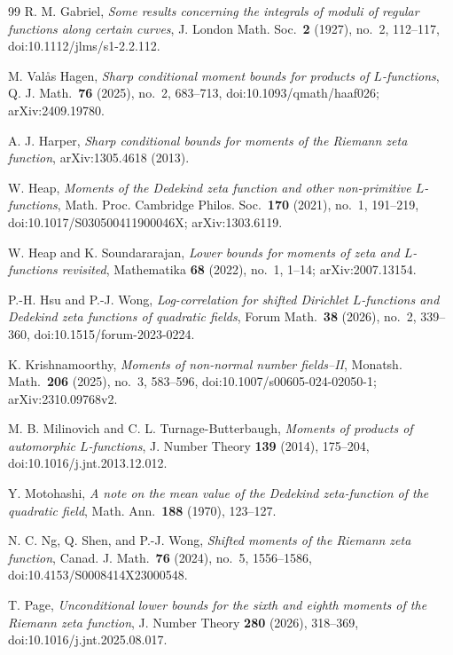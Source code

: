 \documentclass[11pt]{amsart}
\numberwithin{equation}{section}
\theoremstyle{plain}
\begin{document}
\begin{thebibliography}{99}
R. M. Gabriel,
\emph{Some results concerning the integrals of moduli of regular functions
along certain curves},
J. London Math. Soc.\ \textbf{2} (1927), no.~2, 112--117,
doi:10.1112/jlms/s1-2.2.112.

M. Val{\aa}s Hagen,
\emph{Sharp conditional moment bounds for products of $L$-functions},
Q. J. Math.\ \textbf{76} (2025), no.~2, 683--713,
doi:10.1093/qmath/haaf026; arXiv:2409.19780.

A. J. Harper,
\emph{Sharp conditional bounds for moments of the Riemann zeta function},
arXiv:1305.4618 (2013).

W. Heap,
\emph{Moments of the Dedekind zeta function and other non-primitive
$L$-functions},
Math. Proc. Cambridge Philos. Soc.\ \textbf{170} (2021), no.~1, 191--219,
doi:10.1017/S030500411900046X; arXiv:1303.6119.

W. Heap and K. Soundararajan,
\emph{Lower bounds for moments of zeta and $L$-functions revisited},
Mathematika \textbf{68} (2022), no.~1, 1--14;
arXiv:2007.13154.

P.-H. Hsu and P.-J. Wong,
\emph{Log-correlation for shifted Dirichlet $L$-functions and Dedekind zeta
functions of quadratic fields},
Forum Math.\ \textbf{38} (2026), no.~2, 339--360,
doi:10.1515/forum-2023-0224.

K. Krishnamoorthy,
\emph{Moments of non-normal number fields--II},
Monatsh. Math.\ \textbf{206} (2025), no.~3, 583--596,
doi:10.1007/s00605-024-02050-1; arXiv:2310.09768v2.

M. B. Milinovich and C. L. Turnage-Butterbaugh,
\emph{Moments of products of automorphic $L$-functions},
J. Number Theory \textbf{139} (2014), 175--204,
doi:10.1016/j.jnt.2013.12.012.

Y. Motohashi,
\emph{A note on the mean value of the Dedekind zeta-function of the
quadratic field},
Math. Ann.\ \textbf{188} (1970), 123--127.

N. C. Ng, Q. Shen, and P.-J. Wong,
\emph{Shifted moments of the Riemann zeta function},
Canad. J. Math.\ \textbf{76} (2024), no.~5, 1556--1586,
doi:10.4153/S0008414X23000548.

T. Page,
\emph{Unconditional lower bounds for the sixth and eighth moments of the
Riemann zeta function},
J. Number Theory \textbf{280} (2026), 318--369,
doi:10.1016/j.jnt.2025.08.017.


\end{thebibliography}
\end{document}
